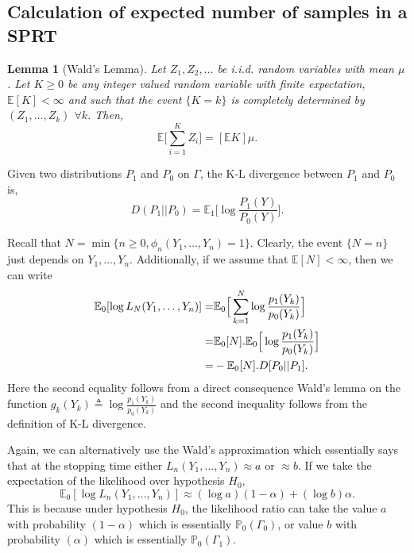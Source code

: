 \documentclass[a4paper,english,12pt]{article}
\newtheorem{lemma}[theorem]{Lemma}
\newenvironment{definition}[1][Definition]{\begin{trivlist}
\item[\hskip \labelsep {\bfseries #1}]}{\end{trivlist}}
\begin{document}
\subsection{Calculation of expected number of samples in a SPRT}
\begin{lemma}[Wald's Lemma]
Let $Z_1, Z_2, \ldots$ be i.i.d. random variables with mean $ \mu $. Let $K\geq 0$ be any integer valued random variable with finite expectation, $ \mathbb{E}[K] < \infty $ and such that the event $ \{K=k\} $ is completely determined by $(Z_1,\ldots, Z_k)$ $\forall k$. Then,
\begin{equation}
\mathbb{E}\Big[\sum_{i=1}^{K}Z_i\Big] = [\mathbb{E}K]\mu.
\end{equation}
\end{lemma}
\begin{definition}[K-L divergence] Given two distributions $ P_1 $ and $ P_0 $ on $ \Gamma $, the K-L divergence between $ P_1 $ and $ P_0 $ is,
\begin{equation*}
D(P_1||P_0) = \mathbb{E}_1\Big[ \log{\frac{P_1(Y)}{P_0(Y)}}\Big].
\end{equation*}
\end{definition}
\par Recall that $N = \min\{n\geq 0, \phi_n(Y_1,\ldots,Y_n)=1\}.$ Clearly, the event $\{N=n\}$ just depends on $Y_1,\ldots, Y_n.$ Additionally, if we assume that $\mathbb{E}[N]<\infty$, then we can write
\begin{eqnarray}\label{eqn:f1}
\notag\mathbb{E}_0[\log L_N(Y_1,\ldots, Y_n)] = & \mathbb{E}_0\Big[\sum_{k=1}^{N}\log \frac{p_1(Y_k)}{p_0(Y_k)}\Big]\\
\notag=& \mathbb{E}_0[N].\mathbb{E}_0\Big[\log \frac{p_1(Y_k)}{p_0(Y_k)}\Big]\\
=& -\mathbb{E}_0[N].D[P_0||P_1].
\end{eqnarray}
Here the second equality follows from a direct consequence Wald's lemma on the function $g_k(Y_k)\triangleq \log\frac{p_1(Y_k)}{p_0(Y_k)}$ and the second inequality follows from the definition of K-L divergence.
\par Again, we can alternatively use the Wald's approximation which essentially says that at the stopping time either $L_n(Y_1,\ldots,Y_n) \approx a \text{ or } \approx b$. If we take the expectation of the likelihood over hypothesis $H_0$,
\begin{equation}\label{eqn:f2}
\mathbb{E}_0[\log L_n(Y_1,\ldots,Y_n)] \approx (\log a)(1-\alpha) + (\log b)\alpha.
\end{equation}
This is because under hypothesis $H_0$, the likelihood ratio can take the value $a$ with probability $(1-\alpha)$ which is essentially $\mathbb{P}_0(\Gamma_0)$, or value $b$ with probability $(\alpha)$ which is essentially $\mathbb{P}_0(\Gamma_1)$.
\end{document}
